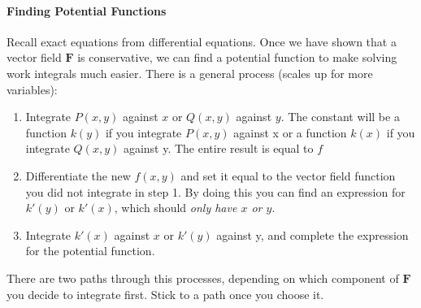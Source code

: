 \documentclass{article}
\begin{document}
\paragraph{Finding Potential Functions} Recall exact equations from differential equations. Once we have shown that a vector field $\mathbf{F}$ is conservative, we can find a potential function to make solving work integrals much easier. There is a general process (scales up for more variables):
\begin{enumerate}
    \item Integrate $P(x,y)$ against $x$ or $Q(x,y)$ against $y$. The constant will be a function $k(y)$ if you integrate $P(x,y)$ against x or a function $k(x)$ if you integrate $Q(x,y)$ against y. The entire result is equal to $f$
    \item Differentiate the new $f(x,y)$ and set it equal to the vector field function you did not integrate in step 1. By doing this you can find an expression for $k'(y)$ or $k'(x)$, which should \textit{only have $x$ or $y$}.
    \item Integrate $k'(x)$ against $x$ or $k'(y)$ against y, and complete the expression for the potential function.
\end{enumerate}
There are two paths through this processes, depending on which component of $\mathbf{F}$ you decide to integrate first. Stick to a path once you choose it.
\end{document}
